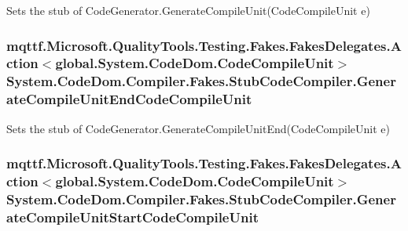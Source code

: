 Sets the stub of Code\-Generator.\-Generate\-Compile\-Unit(\-Code\-Compile\-Unit e)

\hypertarget{class_system_1_1_code_dom_1_1_compiler_1_1_fakes_1_1_stub_code_compiler_aeecd28f0f345a245c628b65b74d93e79}{
\subsubsection[{Generate\-Compile\-Unit\-End\-Code\-Compile\-Unit}]{\setlength{\rightskip}{0pt plus 5cm}mqttf.\-Microsoft.\-Quality\-Tools.\-Testing.\-Fakes.\-Fakes\-Delegates.\-Action$<$global.\-System.\-Code\-Dom.\-Code\-Compile\-Unit$>$ System.\-Code\-Dom.\-Compiler.\-Fakes.\-Stub\-Code\-Compiler.\-Generate\-Compile\-Unit\-End\-Code\-Compile\-Unit}}\label{class_system_1_1_code_dom_1_1_compiler_1_1_fakes_1_1_stub_code_compiler_aeecd28f0f345a245c628b65b74d93e79}


Sets the stub of Code\-Generator.\-Generate\-Compile\-Unit\-End(\-Code\-Compile\-Unit e)

\hypertarget{class_system_1_1_code_dom_1_1_compiler_1_1_fakes_1_1_stub_code_compiler_a89a969f97178016bf0cfb2be1450e662}{
\subsubsection[{Generate\-Compile\-Unit\-Start\-Code\-Compile\-Unit}]{\setlength{\rightskip}{0pt plus 5cm}mqttf.\-Microsoft.\-Quality\-Tools.\-Testing.\-Fakes.\-Fakes\-Delegates.\-Action$<$global.\-System.\-Code\-Dom.\-Code\-Compile\-Unit$>$ System.\-Code\-Dom.\-Compiler.\-Fakes.\-Stub\-Code\-Compiler.\-Generate\-Compile\-Unit\-Start\-Code\-Compile\-Unit}}\label{class_system_1_1_code_dom_1_1_compiler_1_1_fakes_1_1_stub_code_compiler_a89a969f97178016bf0cfb2be1450e662}


